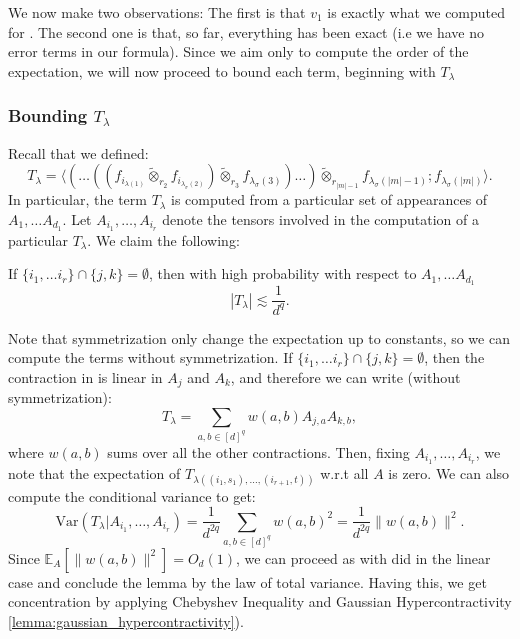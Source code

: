 \documentclass[]{article}
\makeatletter
\numberwithin{equation}{section}
\theoremstyle{definition}
\renewenvironment{proof}[1][\proofname]{\par
  \pushQED{\qed}%
  \normalfont \topsep6\p@\@plus6\p@\relax
  \trivlist
  \item[\hskip\labelsep\textbf{#1.}]\ignorespaces
}{%
  \popQED\endtrivlist\@endpefalse
}
\newcommand{\EE}{\mathbb{E}}
\makeatother
\begin{document}
We now make two observations: The first is that $v_{1}$ is exactly what we computed for . The second one is that, so far, everything has been exact (i.e we have no error terms in our formula). Since we aim only to compute the order of the expectation, we will now proceed to bound each term, beginning with $T_{\lambda}$

\subsubsection{\texorpdfstring{Bounding $T_{\lambda}$}{Bounding T-lambda}}

Recall that we defined: 
\begin{equation}
    T_{\lambda} = \langle (\ldots ((f_{i_{\lambda(1)}} \widetilde{\otimes}_{r_2} f_{i_{\lambda_\sigma(2)}}) \widetilde{\otimes}_{r_3} f_{\lambda_\sigma(3)}) \ldots) \widetilde{\otimes}_{r_{|m|-1}} f_{\lambda_\sigma(|m|-1)}; f_{\lambda_\sigma(|m|)} \rangle.
    \label{def_T_lambda}
\end{equation}
In particular, the term $T_{\lambda}$ is computed from a particular set of appearances of $A_{1}, \dots A_{d_1}$. Let $A_{i_1},\dots, A_{i_r}$ denote the tensors involved in the computation of a particular $T_\lambda$. 
We claim the following: 
\begin{claim}
    If $\{ i_{1}, \dots i_{r}\}\cap \{ j,k\} = \emptyset$, then with high probability with respect to $A_{1}, \dots A_{d_{1}}$
    $$
    \left |T_{\lambda} \right | \lesssim \dfrac{1}{d^{q}}.
    $$
    \label{claim:disjoint_case}
\end{claim}

\begin{proof}
    Note that symmetrization only change the expectation up to constants, so we can compute the terms without symmetrization. If $\{ i_{1}, \dots i_{r}\}\cap \{ j,k\} = \emptyset$, then the contraction in  is linear in $A_j$ and $A_k$, and therefore we can write (without symmetrization): 
    \begin{equation}
        T_{\lambda} = \sum_{a,b \in [d]^{q}} w(a, b)A_{j,a} A_{k,b},
    \end{equation}
    where $w(a, b)$ sums over all the other contractions. 
    Then, fixing $A_{i_1}, \dots, A_{i_r}$, we note that the expectation of $T_{\lambda((i_1,s_1), \dots, (i_{r+1}, t))}$ w.r.t all $A$ is zero. We can also compute the conditional variance to get: 
    \begin{equation}
        \mathrm{Var}(T_{\lambda} |A_{i_1}, \dots, A_{i_r}) = \dfrac{1}{d^{2q}} \sum_{a,b \in [d]^{q}} w(a, b)^{2} = \dfrac{1}{d^{2q}} \| w(a, b)\|^{2}.
    \end{equation}
    Since $\EE_{A}\left [\| w(a, b)\|^{2} \right ]= O_{d}(1)$, we can proceed as with did in the linear case and conclude   the lemma by the law of total variance.  Having this, we get concentration by applying Chebyshev Inequality and Gaussian Hypercontractivity \cref{lemma:gaussian_hypercontractivity}). 
\end{proof}
\end{document}
